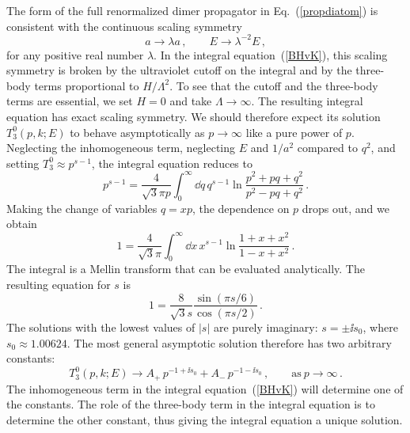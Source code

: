 The form of the full renormalized dimer propagator in
Eq.~(\ref{propdiatom}) is consistent with the continuous scaling symmetry
\begin{equation}
 a \longrightarrow \lambda a \,,
 \qquad
 E \longrightarrow \lambda^{-2} E \,,
\label{scaling-1}
\end{equation}
for any positive real number $\lambda$.
In the integral equation~(\ref{BHvK}), this scaling
symmetry is broken by the ultraviolet cutoff on the integral and by the
three-body terms proportional to $H/ \Lambda^2$. To see that the cutoff and
the three-body terms are essential, we set $H=0$ and take
$\Lambda \rightarrow \infty$. The resulting integral equation has exact
scaling symmetry. We should therefore expect its solution 
$T_3^0 (p,k; E)$ to behave asymptotically as $p \rightarrow \infty$ 
like a pure power of $p$. Neglecting the inhomogeneous term,
neglecting $E$ and $1/a^2$ compared to $q^2$,
and setting $T_3^0 \approx p^{s-1}$, 
the integral equation reduces to~\cite{Danilov:1961aa}
\begin{equation}
 p^{s-1} = \frac{4}{\sqrt{3} \pi p} \int_0^\infty \dd q \, q^{s-1} 
 \ln \frac{p^2 + pq + q^2}{p^2 -pq + q^2} \,.
\end{equation}
Making the change of variables
$q = xp$, the dependence on $p$ drops out, and we obtain
\begin{equation}
 1 = \frac{4}{\sqrt{3} \pi} \int_0^\infty \dd x \, x^{s-1} 
 \ln \frac{1 + x + x^2}{1 -x + x^2} \,.
\end{equation}
The integral is a Mellin transform that can be evaluated
analytically.  The resulting equation for $s$ is
\begin{equation}
 1 = \frac{8}{\sqrt{3} s} \frac{\sin (\pi s/6)}{\cos (\pi s/2)} \,.
\end{equation}
The solutions with the lowest values of $|s|$ are
purely imaginary: $s = \pm \ii s_0$, where $s_0 \approx 1.00624$. The most
general asymptotic solution therefore has two arbitrary constants:
\begin{equation}
 T_3^0 (p, k; E) \longrightarrow A_+ \, 
 p^{-1+\ii s_0} + A_- \, p^{-1-\ii s_0} 
 \,,\qquad \text{as}\ p \to \infty \,.
\end{equation}
The inhomogeneous term in the integral equation~(\ref{BHvK}) will
determine one of the constants. The role of the three-body term in the
integral equation is to determine the other constant, thus giving the
integral equation a unique solution.

